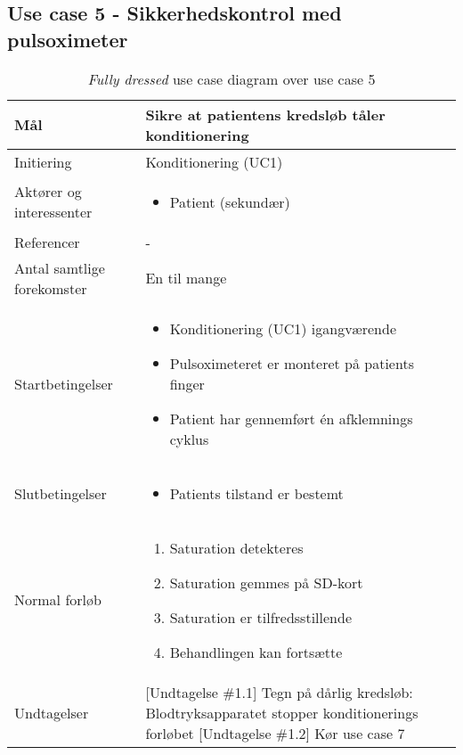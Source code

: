 	\subsection{Use case 5 - Sikkerhedskontrol med pulsoximeter}
	\begin{table}[H]
		\begin{center}
			\begin{tabular}{ | p{} | p{}| } 
				\hline
				Mål & Sikre at patientens kredsløb tåler konditionering \\ 
				\hline
				Initiering &  Konditionering (UC1)\\
				\hline
				Aktører og interessenter & 
				\begin{itemize}
					\item Patient (sekundær)
				\end{itemize} \\ 
				\hline
				Referencer & - \\ 
				\hline
				Antal samtlige forekomster & En til mange \\ 
				\hline	
				Startbetingelser & 
				\begin{itemize}
					\item Konditionering (UC1) igangværende
					\item Pulsoximeteret er monteret på patients finger
					\item Patient har gennemført én afklemnings cyklus
 				\end{itemize} \\ 
				\hline
				Slutbetingelser & 
				\begin{itemize}
					\item Patients tilstand er bestemt 
				\end{itemize} \\ 
				\hline
				Normal forløb & \begin{enumerate}
					\setlength\itemsep{0cm} %
					\item Saturation detekteres
					\item Saturation gemmes på SD-kort
					\item Saturation er tilfredsstillende
					\subitem [Undtagelse \#1.1][Undtagelse \#1.2]
					\item Behandlingen kan fortsætte
				\end{enumerate} \\ 
				\hline
				Undtagelser &  [Undtagelse \#1.1] Tegn på dårlig kredsløb: Blodtryksapparatet stopper konditionerings forløbet 
				[Undtagelse \#1.2] Kør use case 7\\ 
				\hline
			\end{tabular}
		\end{center}
		\caption{\textit{Fully dressed} use case diagram over use case 5}
	\end{table}
			\newpage
